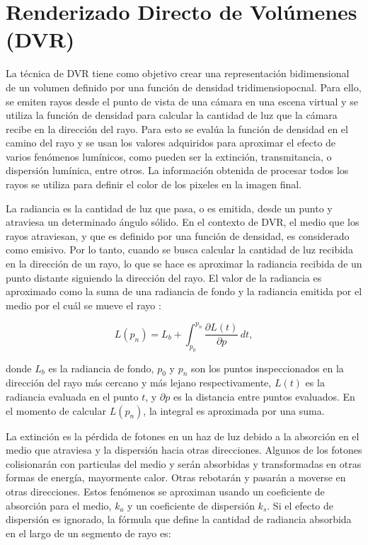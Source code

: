 \documentclass[spanish,a4paper,openright,11pt]{book}
\begin{document}
\section{Renderizado Directo de Volúmenes (DVR)}
La técnica de DVR tiene como objetivo crear una representación bidimensional de un volumen
definido por una función de densidad tridimensiopocnal. Para ello, se emiten rayos desde el punto de vista de una cámara en una escena virtual y se utiliza la función de densidad para calcular la cantidad de luz que la cámara recibe en la dirección del rayo. Para esto se evalúa la función de densidad en el camino del rayo y se usan los valores adquiridos para aproximar el efecto de varios fenómenos lumínicos, como pueden ser la extinción, transmitancia, o dispersión lumínica, entre otros. La información obtenida de procesar todos los rayos se utiliza para definir el color de los pixeles en la imagen final.

La radiancia es la cantidad de luz que pasa, o es emitida, desde un punto y atraviesa un determinado ángulo sólido. En el contexto de DVR, el medio que los rayos atraviesan, y que es definido por una función de densidad, es considerado como emisivo. Por lo tanto, cuando se busca calcular la cantidad de luz recibida en la dirección de un rayo, lo que se hace es aproximar la radiancia recibida de un punto distante siguiendo la dirección del rayo. El valor de la radiancia es aproximado como la suma de una radiancia de fondo y la radiancia emitida por el medio por el cuál se mueve el rayo \cite{Kratz2006} :

\begin{equation} \label{eq:general_radiance}  
  L(p_n) = L_b + \int_{p_0}^{p_n} \frac{\partial L(t)}{\partial p} \, dt,
\end{equation}

\noindent donde $L_b$ es la radiancia de fondo, $p_0$ y $p_n$ son los puntos inspeccionados en la dirección del rayo más cercano y más lejano respectivamente, $L(t)$ es la radiancia evaluada en el punto $t$, y $\partial p$ es la distancia entre puntos evaluados. En el momento de calcular $L(p_n)$, la integral es aproximada por una suma.

La extinción es la pérdida de fotones en un haz de luz debido a la absorción en el medio que atraviesa y la dispersión hacia otras direcciones. Algunos de los fotones colisionarán con particulas del medio y serán absorbidas y transformadas en otras formas de energía, mayormente calor. Otras rebotarán y pasarán a moverse en otras direcciones. Estos fenómenos se aproximan usando un coeficiente de absorción para el medio, $k_a$ y un coeficiente de dispersión $k_s$. Si el efecto de dispersión es ignorado, la fórmula que define la cantidad de radiancia absorbida en el largo de un segmento de rayo
es: 
\end{document}
